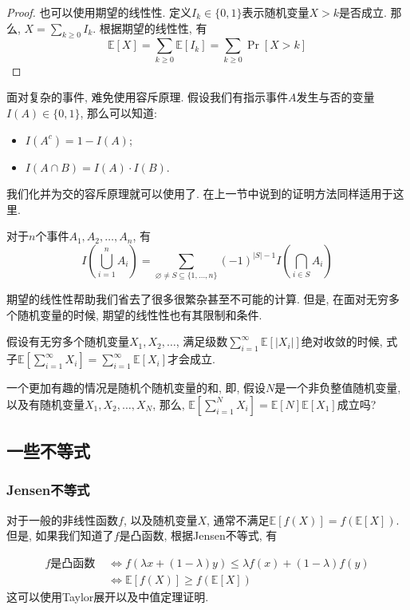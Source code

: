 \documentclass{ctexart}
\begin{document}
\begin{proof}
    也可以使用期望的线性性. 定义$I_k \in \{ 0, 1 \}$表示随机变量$X>k$是否成立. 那么, $X=\sum_{k \geq 0} I_k$. 根据期望的线性性, 有
    $$\mathbb{E}[X]=\sum_{k \geq 0} \mathbb{E}\left[I_k\right]=\sum_{k \geq 0} \operatorname{Pr}[X>k]$$

\end{proof}

面对复杂的事件, 难免使用容斥原理. 假设我们有指示事件$A$发生与否的变量$I(A)\in \{ 0, 1 \}$, 那么可以知道:
\begin{itemize}
    \item $I\left(A^c\right)=1-I(A)$;
    \item $I(A \cap B)=I(A) \cdot I(B)$.
\end{itemize}

我们化并为交的容斥原理就可以使用了. 在上一节中说到的证明方法同样适用于这里. 

\begin{theorem}[容斥原理]
    对于$n$个事件$A_1, A_2, \ldots, A_n$, 有
    $$
I\left(\bigcup_{i=1}^n A_i\right)=\sum_{\varnothing \neq S \subseteq\{1, \ldots, n\}}(-1)^{|S|-1} I\left(\bigcap_{i \in S} A_i\right)
$$
\end{theorem}

期望的线性性帮助我们省去了很多很繁杂甚至不可能的计算. 但是, 在面对无穷多个随机变量的时候, 期望的线性性也有其限制和条件. 

假设有无穷多个随机变量$X_1, X_2, \ldots$, 满足级数$\sum_{i=1}^{\infty} \mathbb{E}\left[\left|X_i\right|\right]$绝对收敛的时候, 式子$\mathbb{E}\left[\sum_{i=1}^{\infty} X_i\right]=\sum_{i=1}^{\infty} \mathbb{E}\left[X_i\right]$才会成立. 

一个更加有趣的情况是随机个随机变量的和, 即, 假设$N$是一个非负整值随机变量, 以及有随机变量$X_1, X_2, \ldots, X_N$, 那么, $\mathbb{E}\left[\sum_{i=1}^N X_i\right]=\mathbb{E}[N] \mathbb{E}\left[X_1\right]$成立吗?

\subsection{一些不等式}

\subsubsection{Jensen不等式} 对于一般的非线性函数$f$, 以及随机变量$X$, 通常不满足$\mathbb{E}[f(X)]=f(\mathbb{E}[X])$. 但是, 如果我们知道了$f$是凸函数, 根据Jensen不等式, 有

$$
\begin{aligned}
f \text {是凸函数 } & \Longleftrightarrow f(\lambda x+(1-\lambda) y) \leq \lambda f(x)+(1-\lambda) f(y) \\
& \Longleftrightarrow \mathbb{E}[f(X)] \geq f(\mathbb{E}[X])
\end{aligned}
$$
这可以使用Taylor展开以及中值定理证明. 
\end{document}
